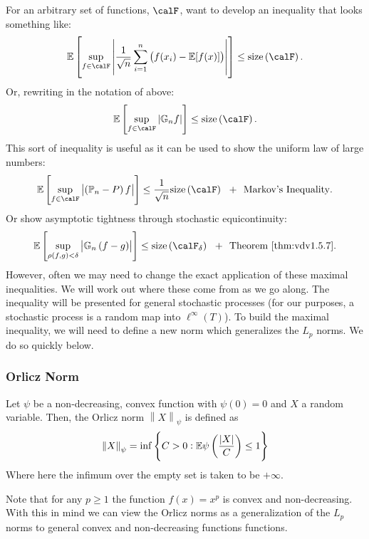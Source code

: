 For an arbitrary set of functions, \(\calF\), want to develop an inequality that looks something like:
\[
	\E\left[\sup_{f\in\calF}\left|\frac{1}{\sqrt{n}}\sum_{i=1}^n \left(f(x_i)-\E[f(x)]\right) \right|\right]\leq \text{size}\left(\calF\right)
.\]
Or, rewriting in the notation of above:
\[
	\E\left[\sup_{f\in\calF}\left|\mathbb{G}_nf\right|\right]\leq \text{size}\left(\calF\right)
.\] 
This sort of inequality is useful as it can be used to show the uniform law of large numbers:
\[
	\E\left[\sup_{f\in\calF}\left|\left(\P_n - P\right)f\right|\right] \leq \frac{1}{\sqrt{n}}\text{size}\left(\calF\right)\hbox{  }\text{ + }\hbox{  }\text{Markov's Inequality}
.\] 
Or show asymptotic tightness through stochastic equicontinuity:
\[
	\E\left[\sup_{\rho(f,g)<\delta}\left|\mathbb{G}_n\left(f-g\right)\right|\right] \leq \text{size}\left(\calF_\delta\right)\hbox{  }\text{ + }\hbox{  }\text{Theorem~\ref{thm:vdv1.5.7}}
.\]
However, often we may need to change the exact application of these maximal inequalities. We will work out where these come from as we go along. The inequality will be presented for general stochastic processes (for our purposes, a stochastic process is a random map into \(\ell^\infty(T)\)). To build the maximal inequality, we will need to define a new norm which generalizes the \(L_p\) norms. We do so quickly below.

\subsubsection{Orlicz Norm}

\begin{definition}
	\label{def:orlicz}
	Let \(\psi\) be a non-decreasing, convex function with  \(\psi(0)=0\) and  \(X\) a random variable. Then, the Orlicz norm  \(\left\|X\right\|_\psi\) is defined as 
	\begin{equation}
		\label{eq:orlicz}
		\left\|X\right\|_\psi = \inf\left\{C > 0 : \mathbb{E}\psi\left(\frac{|X|}{C} \right)\leq 1\right\}
	\end{equation}
	Where here the infimum over the empty set is taken to be \(+\infty\).
\end{definition}
\begin{remark*}
	Note that for any \(p\geq 1\) the function \(f(x) = x^p\) is convex and non-decreasing. With this in mind we can view the Orlicz norms as a generalization of the \(L_p\) norms to general convex and non-decreasing functions functions.
\end{remark*}

